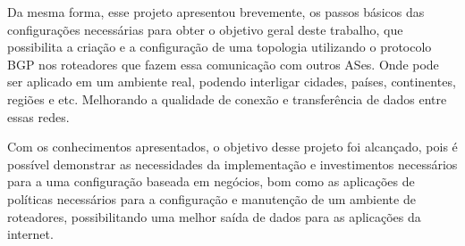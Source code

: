 \documentclass[12pt,a4paper]{report}
\begin{document}
Da mesma forma, esse projeto apresentou brevemente, os passos b\'asicos das configura\c{c}\~oes necess\'arias para obter o objetivo geral deste trabalho, que possibilita a cria\c{c}\~ao e a configura\c{c}\~ao de uma topologia utilizando o protocolo BGP nos roteadores que fazem essa comunica\c{c}\~ao com outros ASes. Onde pode ser aplicado em um ambiente real, podendo interligar cidades, pa\'ises, continentes, regi\~oes e etc. Melhorando a qualidade de conex\~ao e transfer\^encia de dados entre essas redes.

Com os conhecimentos apresentados, o objetivo desse projeto foi alcan\c{c}ado, pois \'e poss\'ivel demonstrar as necessidades da implementa\c{c}\~ao e investimentos necess\'arios para a uma configura\c{c}\~ao baseada em neg\'ocios, bom como as aplica\c{c}\~oes de pol\'iticas necess\'arios para a configura\c{c}\~ao e manuten\c{c}\~ao de um ambiente de roteadores, possibilitando uma melhor sa\'ida de dados para as aplica\c{c}\~oes da internet.




\nocite{*}
\end{document}
